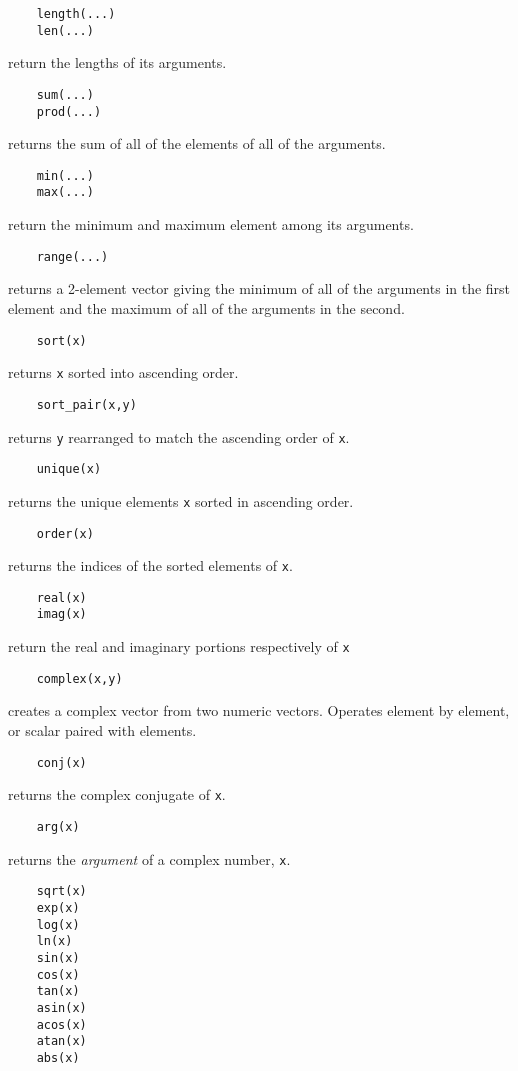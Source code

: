 \begin{verbatim}
    length(...)
    len(...)
\end{verbatim}
return the lengths of its arguments.
\begin{verbatim}
    sum(...)
    prod(...)
\end{verbatim}
returns the sum of all of the elements of all of the arguments.
\begin{verbatim}
    min(...)
    max(...)
\end{verbatim}
return the minimum and maximum element among its arguments.
\begin{verbatim}
    range(...)
\end{verbatim}
returns a 2-element vector giving the minimum of all
of the arguments in the first element and the maximum of all of the
arguments in the second.
\begin{verbatim}
    sort(x)
\end{verbatim}
returns {\tt x} sorted into ascending order.
\begin{verbatim}
    sort_pair(x,y)
\end{verbatim}
returns {\tt y} rearranged to match the ascending order of {\tt x}.
\begin{verbatim}
    unique(x)
\end{verbatim}
returns the unique elements {\tt x} sorted in ascending order.
\begin{verbatim}
    order(x)
\end{verbatim}
returns the indices of the sorted elements of {\tt x}.
\begin{verbatim}
    real(x)
    imag(x)
\end{verbatim}
return the real and imaginary portions respectively of {\tt x}
\begin{verbatim}
    complex(x,y)
\end{verbatim}
creates a complex vector from two numeric vectors. Operates
element by element, or scalar paired with elements.
\begin{verbatim}
    conj(x)
\end{verbatim}
returns the complex conjugate of {\tt x}.
\begin{verbatim}
    arg(x)
\end{verbatim}
returns the {\em argument} of a complex number, {\tt x}.
\begin{verbatim}
    sqrt(x)
    exp(x)
    log(x)
    ln(x)
    sin(x)
    cos(x)
    tan(x)
    asin(x)
    acos(x)
    atan(x)
    abs(x)
\end{verbatim}

